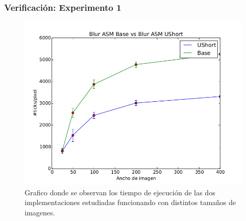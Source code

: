 \subsubsection{Verificación: Experimento 1}


\begin{figure}[H]
\centering
    \includegraphics[scale=0.5]{imgs/blur_ushort.jpg}
  \caption{\footnotesize{Grafico donde se observan los tiempo de ejecución de las dos implementaciones estudiadas funcionando con distintos tamaños de imagenes.}}
  \label{fig:tiempo2}
\end{figure}

